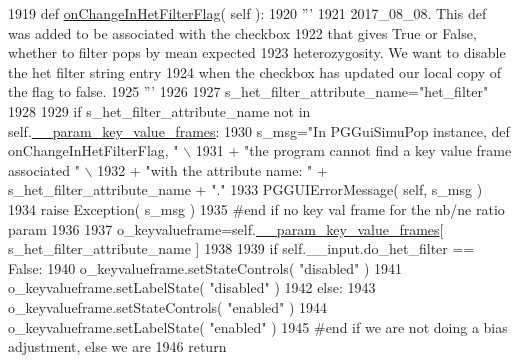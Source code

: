 \begin{DoxyCode}
1919     \textcolor{keyword}{def }\hyperlink{classnegui_1_1pgguisimupop__experimental2_1_1PGGuiSimuPop_a76734c3af2d1be37b20ba4fcbf0a4908}{onChangeInHetFilterFlag}( self ):
1920         \textcolor{stringliteral}{'''}
1921 \textcolor{stringliteral}{        2017\_08\_08.  This def was added to be associated with the checkbox}
1922 \textcolor{stringliteral}{        that gives True or False, whether to filter pops by mean expected}
1923 \textcolor{stringliteral}{        heterozygosity.  We want to disable the het filter string entry }
1924 \textcolor{stringliteral}{        when the checkbox has updated our local copy of the flag to false.}
1925 \textcolor{stringliteral}{        '''}
1926 
1927         s\_het\_filter\_attribute\_name=\textcolor{stringliteral}{"het\_filter"}
1928 
1929         \textcolor{keywordflow}{if} s\_het\_filter\_attribute\_name \textcolor{keywordflow}{not} \textcolor{keywordflow}{in} self.\hyperlink{classnegui_1_1pgguisimupop__experimental2_1_1PGGuiSimuPop_a08bb009e9a24284adfbd8a38dcc0c861}{\_\_param\_key\_value\_frames}:
1930             s\_msg=\textcolor{stringliteral}{"In PGGuiSimuPop instance, def onChangeInHetFilterFlag, "} \(\backslash\)
1931                         + \textcolor{stringliteral}{"the program cannot find a key value frame associated "} \(\backslash\)
1932                         + \textcolor{stringliteral}{"with the attribute name: "} + s\_het\_filter\_attribute\_name + \textcolor{stringliteral}{"."}
1933             PGGUIErrorMessage( self, s\_msg )
1934             \textcolor{keywordflow}{raise} Exception( s\_msg )
1935         \textcolor{comment}{#end if no key val frame for the nb/ne ratio param}
1936 
1937         o\_keyvalueframe=self.\hyperlink{classnegui_1_1pgguisimupop__experimental2_1_1PGGuiSimuPop_a08bb009e9a24284adfbd8a38dcc0c861}{\_\_param\_key\_value\_frames}[ s\_het\_filter\_attribute\_name 
      ]
1938 
1939         \textcolor{keywordflow}{if} self.\_\_input.do\_het\_filter == \textcolor{keyword}{False}:
1940             o\_keyvalueframe.setStateControls( \textcolor{stringliteral}{"disabled"} )
1941             o\_keyvalueframe.setLabelState( \textcolor{stringliteral}{"disabled"} )
1942         \textcolor{keywordflow}{else}:
1943             o\_keyvalueframe.setStateControls( \textcolor{stringliteral}{"enabled"} )
1944             o\_keyvalueframe.setLabelState( \textcolor{stringliteral}{"enabled"} )
1945         \textcolor{comment}{#end if we are not doing a bias adjustment, else we are }
1946         \textcolor{keywordflow}{return}
\end{DoxyCode}
